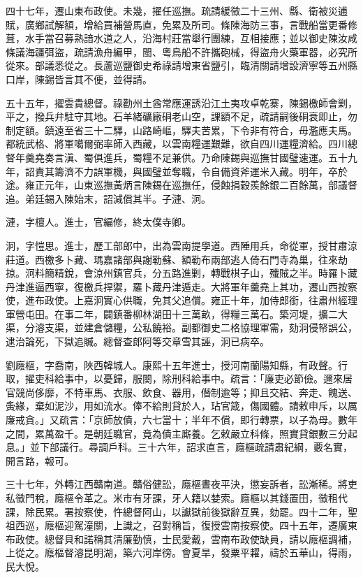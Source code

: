 \begin{pinyinscope}
四十七年，遷山東布政使。未幾，擢任巡撫。疏請緩徵二十三州、縣、衛被災逋賦，廣鄉試解額，增給買補營馬直，免累及所司。條陳海防三事，言戰船當更番修葺，水手當召募熟諳水道之人，沿海村莊當舉行團練，互相接應；並以御史陳汝咸條議海疆弭盜，疏請漁舟編甲，閩、粵鳥船不許攜砲械，得盜舟火藥軍器，必究所從來。部議悉從之。長蘆巡鹽御史希祿請增東省鹽引，臨清關請增設濟寧等五州縣口岸，陳錫皆言其不便，並得請。

五十五年，擢雲貴總督。祿勸州土酋常應運誘沿江土夷攻卓乾寨，陳錫檄師會剿，平之，撥兵弁駐守其地。石羊緒礦廠硐老山空，課額不足，疏請嗣後硐衰即止，勿制定額。鎮遠至省三十二驛，山路崎嶇，驛夫苦累，下令非有符合，毋濫應夫馬。都統武格、將軍噶爾弼率師入西藏，以雲南糧運艱難，欲自四川運糧濟給。四川總督年羹堯奏言滇、蜀俱進兵，蜀糧不足兼供。乃命陳錫與巡撫甘國璧速運。五十九年，詔責其籌濟不力誤軍機，與國璧並奪職，令自備資斧運米入藏。明年，卒於途。雍正元年，山東巡撫黃炳言陳錫在巡撫任，侵蝕捐穀羨餘銀二百餘萬，部議督追。弟廷錫入陳始末，詔減償其半。子漣、泂。

漣，字檀人。進士，官編修，終太僕寺卿。

泂，字愷思。進士，歷工部郎中，出為雲南提學道。西陲用兵，命從軍，授甘肅涼莊道。西檄多卜藏、瑪嘉諸部與謝勒蘇、額勒布兩部逃人倚石門寺為巢，往來劫掠。泂料簡精銳，會涼州鎮官兵，分五路進剿，轉戰棋子山，殲賊之半。時羅卜藏丹津進逼西寧，復檄兵捍禦，羅卜藏丹津遁走。大將軍年羹堯上其功，遷山西按察使，進布政使。上嘉泂實心供職，免其父追償。雍正十年，加侍郎銜，往肅州經理軍營屯田。在事二年，闢鎮番柳林湖田十三萬畝，得糧三萬石。築河堤，擴二大渠，分濬支渠，並建倉儲糧，公私饒裕。副都御史二格協理軍需，劾泂侵帑誤公，逮治論死，下獄追贓。總督查郎阿等交章雪其誣，泂已病卒。

劉廕樞，字喬南，陜西韓城人。康熙十五年進士，授河南蘭陽知縣，有政聲。行取，擢吏科給事中，以憂歸，服闋，除刑科給事中。疏言：「廉吏必節儉。邇來居官競尚侈靡，不特車馬、衣服、飲食、器用，僭制逾等；抑且交結、奔走、餽送、夤緣，棄如泥沙，用如流水。俸不給則貸於人，玷官箴，傷國體。請敕申斥，以厲廉戒貪。」又疏言：「京師放債，六七當十；半年不償，即行轉票，以子為母。數年之間，累萬盈千。是朝廷職官，竟為債主廝養。乞敕嚴立科條，照實貸銀數三分起息。」並下部議行。尋調戶科。三十六年，詔求直言，廕樞疏請肅紀綱，覈名實，開言路，報可。

三十七年，外轉江西贛南道。贛俗健訟，廕樞晝夜平決，懲妄訴者，訟漸稀。將吏私徵門稅，廕樞令革之。米市有牙課，牙人籍以婪索。廕樞以其錢置田，徵租代課，除民累。署按察使，忤總督阿山，以讞獄前後獄辭互異，劾罷。四十二年，聖祖西巡，廕樞迎駕潼關，上識之，召對稱旨，復授雲南按察使。四十五年，遷廣東布政使。總督貝和諾稱其清廉勤慎，士民愛戴，雲南布政使缺員，請以廕樞調補，上從之。廕樞督濬昆明湖，築六河岸徬。會夏旱，發粟平糶，禱於五華山，得雨，民大悅。


\end{pinyinscope}
